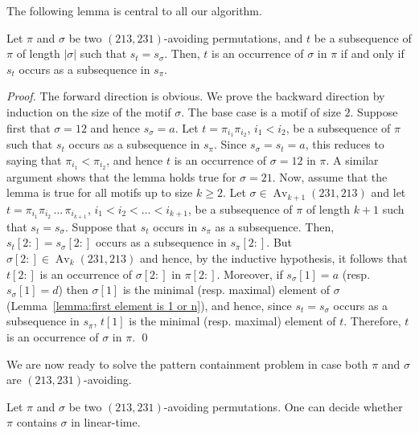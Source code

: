 \documentclass[a4paper]{llncs}
\DeclareMathOperator{\Avd}{Av}
\newcommand\Av[2]{\Avd_{{#1}}({#2})}
\begin{document}
The following lemma is central to all our algorithm.

\begin{lemma}
\label{lemma:MatchStripeToPermutation}
Let $\pi$ and $\sigma$ be two $(213,231)$-avoiding permutations,
and $t$ be a subsequence of $\pi$ of length $|\sigma|$ such that $s_t = s_\sigma$.
Then, $t$ is an occurrence of $\sigma$ in $\pi$ if and only if
$s_t$ occurs as a subsequence in $s_\pi$.
\end{lemma}

\begin{proof}
  The forward direction is obvious.
  We prove the backward direction by induction on the size of the motif
  $\sigma$.
  The base case is a motif of size $2$.
  Suppose first that $\sigma = 12$ and hence $s_\sigma = a$.
  Let $t = \pi_{i_1}\pi_{i_2}$, $i_1 < i_2$, be a subsequence of $\pi$
  such that $s_t$ occurs as a subsequence in $s_\pi$.
  Since $s_\sigma = s_t = a$, this reduces to saying that
  $\pi_{i_1} < \pi_{i_2}$, and hence $t$ is an occurrence of $\sigma = 12$ in $\pi$.
  A similar argument shows that the lemma holds true for $\sigma = 21$.
  Now, assume that the lemma is true for all motifs up to size $k \geq 2$.
  Let $\sigma \in \Av{k+1}{231,213}$ and
  let $t = \pi_{i_1}\pi_{i_2}\,\ldots\,\pi_{i_{k+1}}$,
  $i_1 < i_2 < \ldots < i_{k+1}$,
  be a subsequence of $\pi$ of length $k+1$ such that
  $s_t = s_\sigma$.
  Suppose that $s_t$ occurs in $s_\pi$ as a subsequence.
  Then, $s_t[2:] = s_\sigma[2:]$ occurs as a subsequence in $s_\pi[2:]$.
  But $\sigma[2:] \in \Av{k}{231,213}$ and hence,
  by the inductive hypothesis, it follows that
  $t[2:]$ is an occurrence of $\sigma[2:]$ in $\pi[2:]$.
  Moreover, if $s_\sigma[1] = a$ (resp. $s_\sigma[1] = d$)
  then $\sigma[1]$ is the minimal (resp. maximal) element of $\sigma$
  (Lemma~\ref{lemma:first element is 1 or n}),
  and hence, since $s_t = s_\sigma$ occurs as a subsequence in $s_\pi$,
  $t[1]$ is the minimal (resp. maximal) element of $t$.
  Therefore, $t$ is an occurrence of $\sigma$ in $\pi$.
  \qed
\end{proof}

We are now ready to solve the pattern containment problem in case
both $\pi$ and $\sigma$ are $(213, 231)$-avoiding.

\begin{proposition}
	Let $\pi$ and $\sigma$ be two $(213,231)$-avoiding permutations.
	One can decide whether $\pi$ contains $\sigma$ in linear-time.
\end{proposition}
\end{document}
